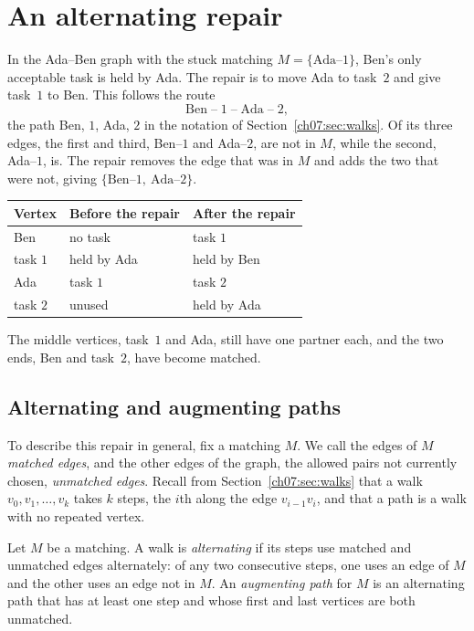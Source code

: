 \section{An alternating repair}\label{ch08:sec:augment}
In the Ada--Ben graph with the stuck matching $M=\{\text{Ada--}1\}$, Ben's only acceptable task is held by Ada. The repair is to move Ada to task~$2$ and give task~$1$ to Ben. This follows the route
\[
\text{Ben}\;\text{--}\;1\;\text{--}\;\text{Ada}\;\text{--}\;2,
\]
the path Ben, $1$, Ada, $2$ in the notation of Section~\ref{ch07:sec:walks}. Of its three edges, the first and third, Ben--$1$ and Ada--$2$, are not in $M$, while the second, Ada--$1$, is. The repair removes the edge that was in $M$ and adds the two that were not, giving $\{\text{Ben--}1,\ \text{Ada--}2\}$.
\begin{center}
\begin{tabular}{lll}
\toprule
Vertex & Before the repair & After the repair\\
\midrule
Ben & no task & task $1$\\
task $1$ & held by Ada & held by Ben\\
Ada & task $1$ & task $2$\\
task $2$ & unused & held by Ada\\
\bottomrule
\end{tabular}
\end{center}
The middle vertices, task~$1$ and Ada, still have one partner each, and the two ends, Ben and task~$2$, have become matched.

\subsection*{Alternating and augmenting paths}
To describe this repair in general, fix a matching $M$. We call the edges of $M$ \emph{matched edges}, and the other edges of the graph, the allowed pairs not currently chosen, \emph{unmatched edges}. Recall from Section~\ref{ch07:sec:walks} that a walk $v_0,v_1,\ldots,v_k$ takes $k$ steps, the $i$th along the edge $v_{i-1}v_i$, and that a path is a walk with no repeated vertex.

\par\noindent\begin{minipage}{\linewidth}
\begin{definition}\label{ch08:def:augmenting}
Let $M$ be a matching. A walk is \emph{alternating} if its steps use matched and unmatched edges alternately: of any two consecutive steps, one uses an edge of $M$ and the other uses an edge not in $M$. An \emph{augmenting path} for $M$ is an alternating path that has at least one step and whose first and last vertices are both unmatched.
\end{definition}
\end{minipage}\par

